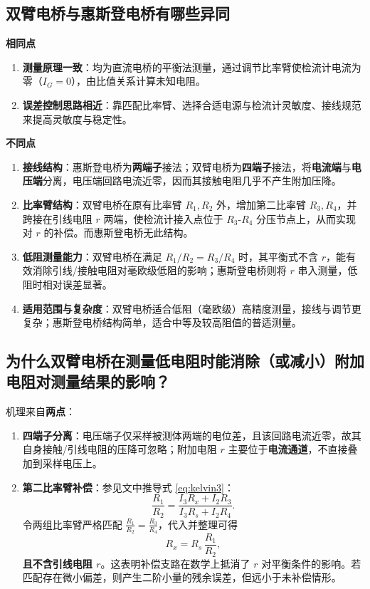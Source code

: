 \documentclass[]{../../templates/Report}%
\begin{document}
\begin{fullreportonly}
\subsection{双臂电桥与惠斯登电桥有哪些异同}
\noindent\textbf{相同点}
\begin{enumerate}[label=(\arabic*)]
    \item \textbf{测量原理一致}：均为直流电桥的平衡法测量，通过调节比率臂使检流计电流为零（$I_G=0$），由比值关系计算未知电阻。
    \item \textbf{误差控制思路相近}：靠匹配比率臂、选择合适电源与检流计灵敏度、接线规范来提高灵敏度与稳定性。
\end{enumerate}

\noindent\textbf{不同点}
\begin{enumerate}[label=(\arabic*)]
    \item \textbf{接线结构}：惠斯登电桥为\textbf{两端子}接法；双臂电桥为\textbf{四端子}接法，将\textbf{电流端}与\textbf{电压端}分离，电压端回路电流近零，因而其接触电阻几乎不产生附加压降。
    \item \textbf{比率臂结构}：双臂电桥在原有比率臂 $R_1,R_2$ 外，增加第二比率臂 $R_3,R_4$，并跨接在引线电阻 $r$ 两端，使检流计接入点位于 $R_3$-$R_4$ 分压节点上，从而实现对 $r$ 的补偿。而惠斯登电桥无此结构。
    \item \textbf{低阻测量能力}：双臂电桥在满足 $R_1/R_2=R_3/R_4$ 时，其平衡式不含 $r$，能有效消除引线/接触电阻对毫欧级低阻的影响；惠斯登电桥则将 $r$ 串入测量，低阻时相对误差显著。
    \item \textbf{适用范围与复杂度}：双臂电桥适合低阻（毫欧级）高精度测量，接线与调节更复杂；惠斯登电桥结构简单，适合中等及较高阻值的普适测量。
\end{enumerate}

\subsection{为什么双臂电桥在测量低电阻时能消除（或减小）附加电阻对测量结果的影响？}
机理来自\textbf{两点}：
\begin{enumerate}[label=(\arabic*)]
    \item \textbf{四端子分离}：电压端子仅采样被测体两端的电位差，且该回路电流近零，故其自身接触/引线电阻的压降可忽略；附加电阻 $r$ 主要位于\textbf{电流通道}，不直接叠加到采样电压上。
    \item \textbf{第二比率臂补偿}：参见文中推导式 \eqref{eq:kelvin3}：
    \begin{equation}
        \frac{R_1}{R_2} = \frac{I_3 R_x + I_2 R_3}{I_3 R_s + I_2 R_4} .
    \end{equation}
    令两组比率臂严格匹配 $\tfrac{R_1}{R_2}=\tfrac{R_3}{R_4}$，代入并整理可得
    \begin{equation}
        R_x = R_s\,\frac{R_1}{R_2},
    \end{equation}
    \noindent\textbf{且不含引线电阻 $r$}。这表明补偿支路在数学上抵消了 $r$ 对平衡条件的影响。若匹配存在微小偏差，则产生二阶小量的残余误差，但远小于未补偿情形。
\end{enumerate}


\end{fullreportonly}
\end{document}

